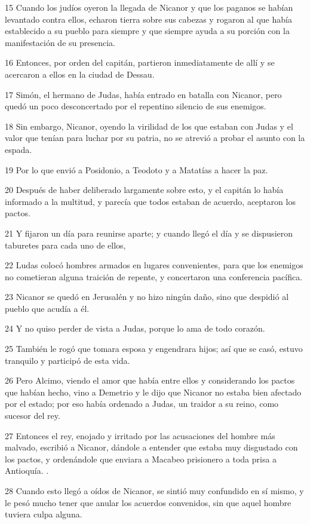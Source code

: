 \par 15 Cuando los judíos oyeron la llegada de Nicanor y que los paganos se habían levantado contra ellos, echaron tierra sobre sus cabezas y rogaron al que había establecido a su pueblo para siempre y que siempre ayuda a su porción con la manifestación de su presencia.
\par 16 Entonces, por orden del capitán, partieron inmediatamente de allí y se acercaron a ellos en la ciudad de Dessau.
\par 17 Simón, el hermano de Judas, había entrado en batalla con Nicanor, pero quedó un poco desconcertado por el repentino silencio de sus enemigos.
\par 18 Sin embargo, Nicanor, oyendo la virilidad de los que estaban con Judas y el valor que tenían para luchar por su patria, no se atrevió a probar el asunto con la espada.
\par 19 Por lo que envió a Posidonio, a Teodoto y a Matatías a hacer la paz.
\par 20 Después de haber deliberado largamente sobre esto, y el capitán lo había informado a la multitud, y parecía que todos estaban de acuerdo, aceptaron los pactos.
\par 21 Y fijaron un día para reunirse aparte; y cuando llegó el día y se dispusieron taburetes para cada uno de ellos,
\par 22 Ludas colocó hombres armados en lugares convenientes, para que los enemigos no cometieran alguna traición de repente, y concertaron una conferencia pacífica.
\par 23 Nicanor se quedó en Jerusalén y no hizo ningún daño, sino que despidió al pueblo que acudía a él.
\par 24 Y no quiso perder de vista a Judas, porque lo ama de todo corazón.
\par 25 También le rogó que tomara esposa y engendrara hijos; así que se casó, estuvo tranquilo y participó de esta vida.
\par 26 Pero Alcimo, viendo el amor que había entre ellos y considerando los pactos que habían hecho, vino a Demetrio y le dijo que Nicanor no estaba bien afectado por el estado; por eso había ordenado a Judas, un traidor a su reino, como sucesor del rey.
\par 27 Entonces el rey, enojado y irritado por las acusaciones del hombre más malvado, escribió a Nicanor, dándole a entender que estaba muy disgustado con los pactos, y ordenándole que enviara a Macabeo prisionero a toda prisa a Antioquía. .
\par 28 Cuando esto llegó a oídos de Nicanor, se sintió muy confundido en sí mismo, y le pesó mucho tener que anular los acuerdos convenidos, sin que aquel hombre tuviera culpa alguna.
